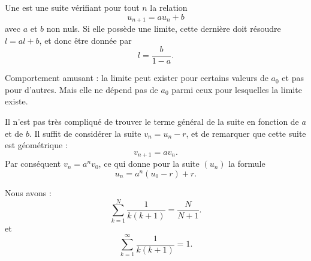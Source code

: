\begin{example}
    Une  est une suite vérifiant pour tout \( n\) la relation
    \begin{equation}
        u_{n+1}=au_n+b
    \end{equation}
    avec \( a\) et \( b\) non nuls. Si elle possède une limite, cette dernière doit résoudre \( l=al+b\), et donc être donnée par
    \begin{equation}
        l=\frac{ b }{ 1-a }.
    \end{equation}

    Comportement amusant : la limite peut exister pour certains valeurs de \( a_0\) et pas pour d'autres. Mais elle ne dépend pas de \( a_0\) parmi ceux pour lesquelles la limite existe.

    Il n'est pas très compliqué de trouver le terme général de la suite en fonction de \( a\) et de \( b\). Il suffit de considérer la suite \( v_n=u_n-r\), et de remarquer que cette suite est géométrique :
    \begin{equation}
        v_{n+1}=av_n.
    \end{equation}
    Par conséquent \( v_n=a^nv_0\), ce qui donne pour la suite \( (u_n)\) la formule
    \begin{equation}
        u_n=a^n(u_0-r)+r.
    \end{equation}
\end{example}

\begin{lemma}     \label{LEMooKDHPooPlFTIT}
    Nous avons :
    \begin{equation}
        \sum_{k=1}^N\frac{1}{ k(k+1) }=\frac{ N }{ N+1 }.
    \end{equation}
    et
    \begin{equation}
        \sum_{k=1}^{\infty}\frac{1}{ k(k+1) }=1.
    \end{equation}
\end{lemma}


